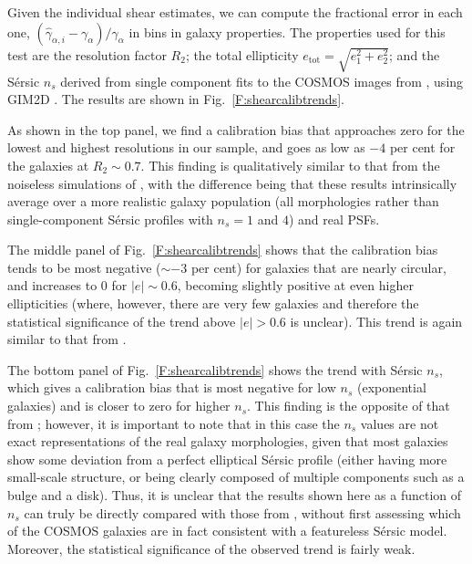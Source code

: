 \documentclass[twocolumn,useAMS,usenatbib]{mn2e}
\newcommand{\etot}{\ensuremath{e_\mathrm{tot}}}
\begin{document}
Given the individual shear estimates, we can compute the fractional
error in each one, $(\hat{\gamma}_{\alpha,
  i}-\gamma_\alpha)/\gamma_\alpha$ in bins in galaxy properties.  The properties used for this
test are the resolution factor $R_2$; the total ellipticity
$\etot = \sqrt{e_1^2+e_2^2}$; and the S\'ersic $n_s$ derived from single
component fits to the
COSMOS images from \cite{2007ApJS..172..434S}, using {\sc GIM2D}
\citep{1998ApJ...507..585M}. The results are shown in
Fig.~\ref{F:shearcalibtrends}.

As shown in the top panel, we find a calibration bias that approaches
zero for the lowest and highest resolutions in our
sample, and goes as low as $-4$ per cent for the galaxies at $R_2\sim
0.7$.  This finding is qualitatively similar to that from the
noiseless simulations of \cite{2005MNRAS.361.1287M}, with the
difference being that these results intrinsically average over a more
realistic galaxy population (all morphologies rather than
single-component S\'ersic profiles with $n_s=1$ and $4$) and real PSFs. 

The middle panel of Fig.~\ref{F:shearcalibtrends} shows that the
calibration bias tends to be most negative ($\sim -3$ per cent) for
galaxies that are nearly circular, and increases to $0$ for $|e|\sim
0.6$, becoming slightly positive at even higher ellipticities (where, however,
there are very few galaxies and therefore the statistical significance
of the trend 
above $|e|>0.6$ is unclear).  This trend is again similar to that
from \cite{2005MNRAS.361.1287M}.%

The bottom panel of Fig.~\ref{F:shearcalibtrends} shows the trend with
S\'ersic $n_s$, which gives a calibration bias that is most negative
for low $n_s$ (exponential galaxies) and is closer to zero for higher
$n_s$.  This finding is the opposite of that from
\cite{2005MNRAS.361.1287M}; however, it is important to note that in
this case the $n_s$ values are not exact representations of the real
galaxy morphologies, given that most galaxies show some deviation from
a perfect elliptical S\'ersic profile (either having more small-scale
structure, or being clearly composed of multiple components such as a
bulge and a disk).  Thus, it is unclear that the results shown here as
a function of $n_s$ can truly be directly compared with those from
\cite{2005MNRAS.361.1287M}, without first assessing which of the
COSMOS galaxies are in fact consistent with a featureless %
S\'ersic model.  Moreover, the statistical significance of the
observed trend is fairly weak.
\end{document}
